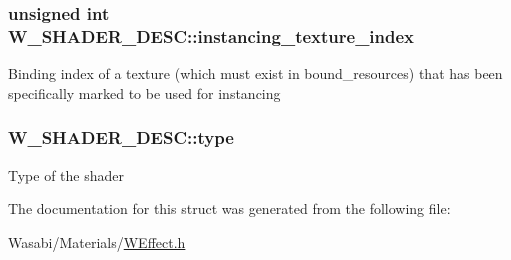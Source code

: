 \subsubsection[{\texorpdfstring{instancing\+\_\+texture\+\_\+index}{instancing_texture_index}}]{\setlength{\rightskip}{0pt plus 5cm}unsigned int W\+\_\+\+S\+H\+A\+D\+E\+R\+\_\+\+D\+E\+S\+C\+::instancing\+\_\+texture\+\_\+index}\hypertarget{struct_w___s_h_a_d_e_r___d_e_s_c_a23a05bd7613ca8b029f14e27130a7844}{}\label{struct_w___s_h_a_d_e_r___d_e_s_c_a23a05bd7613ca8b029f14e27130a7844}
Binding index of a texture (which must exist in bound\+\_\+resources) that has been specifically marked to be used for instancing 
\subsubsection[{\texorpdfstring{type}{type}}]{ W\+\_\+\+S\+H\+A\+D\+E\+R\+\_\+\+D\+E\+S\+C\+::type}\hypertarget{struct_w___s_h_a_d_e_r___d_e_s_c_ad7b83db0ce3b5eb747a0fea76b52acd5}{}\label{struct_w___s_h_a_d_e_r___d_e_s_c_ad7b83db0ce3b5eb747a0fea76b52acd5}
Type of the shader 

The documentation for this struct was generated from the following file\+:\begin{DoxyCompactItemize}
\item 
Wasabi/\+Materials/\hyperlink{_w_effect_8h}{W\+Effect.\+h}\end{DoxyCompactItemize}
